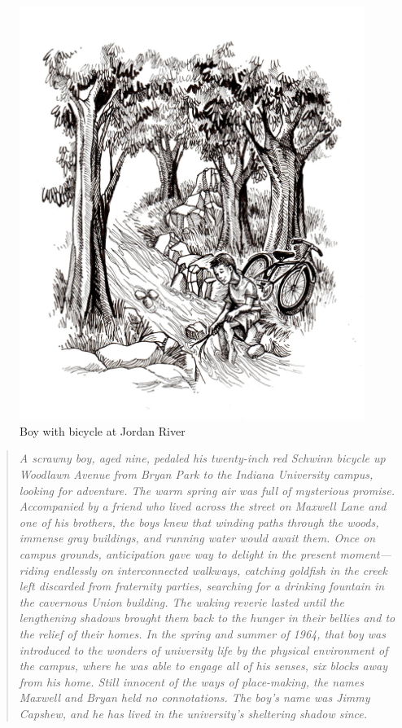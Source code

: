 \documentclass[
  american,
  letterpaper,
]{scrreprt}
\newenvironment{anecdote}
  {\begin{quote}\itshape}
  {\end{quote}}
\begin{document}
\begin{figure}[H]

{\centering \includegraphics[width=0.6\linewidth,height=\textheight,keepaspectratio]{images/acknowledgements.jpeg}

}

\caption{Boy with bicycle at Jordan River}

\end{figure}%

\begin{anecdote}
A scrawny boy, aged nine, pedaled his twenty-inch red Schwinn bicycle up Woodlawn Avenue from Bryan Park to the Indiana University campus, looking for adventure. The warm spring air was full of mysterious promise. Accompanied by a friend who lived across the street on Maxwell Lane and one of his brothers, the boys knew that winding paths through the woods, immense gray buildings, and running water would await them. Once on campus grounds, anticipation gave way to delight in the present moment---riding endlessly on interconnected walkways, catching goldfish in the creek left discarded from fraternity parties, searching for a drinking fountain in the cavernous Union building. The waking reverie lasted until the lengthening shadows brought them back to the hunger in their bellies and to the relief of their homes. In the spring and summer of 1964, that boy was introduced to the wonders of university life by the physical environment of the campus, where he was able to engage all of his senses, six blocks away from his home. Still innocent of the ways of place-making, the names Maxwell and Bryan held no connotations. The boy's name was Jimmy Capshew, and he has lived in the university's sheltering shadow since.
\end{anecdote}
\end{document}
